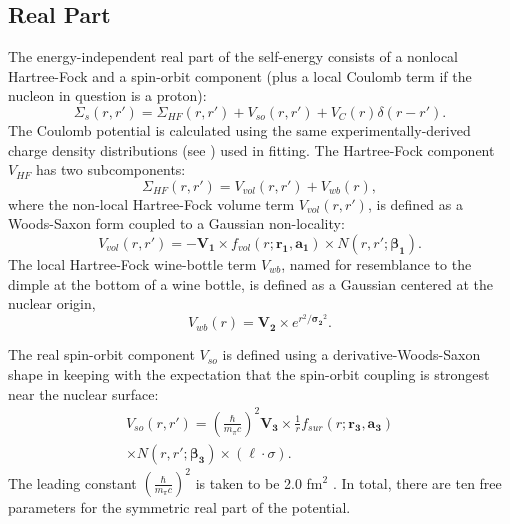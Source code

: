 \documentclass[twocolumn,secnumarabic,amssymb, nobibnotes, aps, prl,
superscriptaddress, nobalancelastpage]{revtex4}
\begin{document}
\subsection{Real Part}
The energy-independent real part of the self-energy consists of a nonlocal Hartree-Fock and
a spin-orbit component (plus a local Coulomb term if the nucleon in question is a proton):
\begin{equation}
    \Sigma_{s}(r,r') =
    \Sigma_{HF}(r,r')+V_{so}(r,r')+V_{C}(r)\delta(r-r').
\end{equation}
The Coulomb potential is calculated using the same experimentally-derived charge
density distributions (see \cite{DeVries1987}) used in fitting.
The Hartree-Fock component $V_{HF}$ has two subcomponents:
\begin{equation} \label{HFWBEquation}
    \Sigma_{HF}(r,r') = V_{vol}(r,r') + V_{wb}(r),
\end{equation}
where the non-local Hartree-Fock volume term $V_{vol}(r,r')$, is defined as
a Woods-Saxon form coupled to a Gaussian non-locality:
\begin{equation} \label{RealVolume}
    V_{vol}(r,r') = -\mathbf{V_{1}}{\times}f_{vol}(r; \mathbf{r_{1}}, \mathbf{a_{1}})
    {\times}N(r,r';\boldsymbol{\beta_{1}}).
\end{equation}
The local Hartree-Fock wine-bottle
term $V_{wb}$, named for resemblance to the dimple at the bottom of a wine
bottle, is defined as a Gaussian centered at the nuclear origin,
\begin{equation}
    V_{wb}(r) = \mathbf{V_{2}}{\times}e^{r^{2}/\boldsymbol{\sigma_{2}}^{2}}.
\end{equation}

The real spin-orbit component $V_{so}$ is defined using a derivative-Woods-Saxon
shape in keeping with the expectation that the spin-orbit coupling is strongest near the
nuclear surface:
\begin{equation} \label{RealSOEquation}
    \begin{split}
        V_{so}(r,r') = \left(\frac{\hbar}{m_{\pi}c}\right)^{2}
        \mathbf{V_{3}}\times\frac{1}{r}f_{sur}(r;\mathbf{r_{3}}, \mathbf{a_{3}})\\
        {\times}N(r,r';\boldsymbol{\beta_{3}}) {\times}(\ell\cdot\sigma).
    \end{split}
\end{equation}
The leading constant $\left(\frac{\hbar}{m_{\pi}c}\right)^{2}$ is taken to be 2.0 fm$^{2}$
\cite{MahzoonPhDThesis}. In total, there are ten free parameters for the
symmetric real part of the potential.
\end{document}
